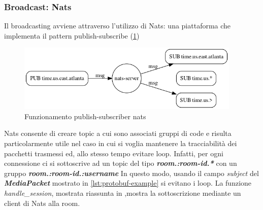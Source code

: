 \documentclass{article}
\begin{document}
\subsubsection{Broadcast: Nats} 
Il broadcasting avviene attraverso l'utilizzo di Nats\cite{Nats}: una piattaforma che implementa il
pattern publish-subscribe (\cref{fig:nats})
\begin{figure}
  \begin{center}
    \includegraphics[width=0.95\textwidth]{figures/nats.png}
  \end{center}
  \caption{Funzionamento publish-subscriber nats}\label{fig:nats}
\end{figure}
Nats consente di creare topic a cui sono associati gruppi di code e risulta particolarmente
utile nel caso in cui si voglia mantenere la tracciabilità dei pacchetti trasmessi ed, allo
stesso tempo evitare loop. Infatti, per ogni connessione ci si sottoscrive ad un topic 
del tipo \textbf{\textit{room.:room-id.*}} con un gruppo \textbf{\textit{room.:room-id.:username}}
In questo modo, usando il campo \textit{subject} del \textbf{\textit{MediaPacket}} mostrato 
in \cref{lst:protobuf-example} si evitano i loop. La funzione \textit{handle\_session},
mostrata riassunta in ,mostra la sottoscrizione mediante un client di Nats alla room. 
\end{document}
